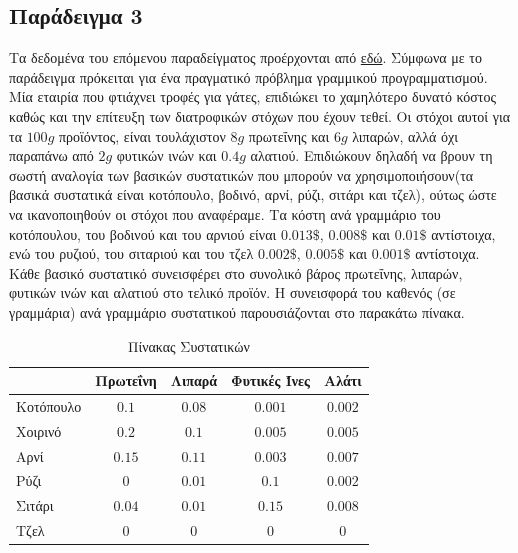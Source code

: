 \subsection{Παράδειγμα 3}
Τα δεδομένα του επόμενου παραδείγματος προέρχονται από
\href{http://pythonhosted.org/PuLP/CaseStudies/a_blending_problem.html}{εδώ}.
Σύμφωνα με το παράδειγμα πρόκειται για ένα πραγματικό πρόβλημα γραμμικού προγραμματισμού.
Μία εταιρία που φτιάχνει τροφές για γάτες, επιδιώκει το χαμηλότερο δυνατό κόστος καθώς
και την επίτευξη των διατροφικών στόχων που έχουν τεθεί. Οι στόχοι αυτοί για τα $100 g$
προϊόντος, είναι τουλάχιστον $8 g$ πρωτεΐνης και $6 g$ λιπαρών, αλλά όχι παραπάνω
από $2 g$ φυτικών ινών και $0.4 g$ αλατιού. Επιδιώκουν δηλαδή να βρουν τη σωστή
αναλογία των βασικών συστατικών που μπορούν να χρησιμοποιήσουν(τα βασικά συστατικά
είναι κοτόπουλο, βοδινό, αρνί, ρύζι, σιτάρι και τζελ), ούτως ώστε να ικανοποιηθούν
οι στόχοι που αναφέραμε. Τα κόστη ανά γραμμάριο του κοτόπουλου, του βοδινού και του
αρνιού είναι $0.013\$$, $0.008\$$ και $0.01\$$ αντίστοιχα, ενώ του ρυζιού, του
σιταριού και του τζελ $0.002\$$, $0.005\$$ και $0.001\$$ αντίστοιχα. Κάθε βασικό
συστατικό συνεισφέρει στο συνολικό βάρος πρωτεΐνης, λιπαρών, φυτικών ινών και αλατιού
στο τελικό προϊόν. Η συνεισφορά του καθενός (σε γραμμάρια) ανά γραμμάριο συστατικού
παρουσιάζονται στο παρακάτω πίνακα.
\begin{table}[h]
    \centering
    \begin{tabulary}{0.95\textwidth}{ | p{2cm} | C | C | C | C | }
        \hline
        {}        & Πρωτεΐνη & Λιπαρά & Φυτικές Ίνες & Αλάτι \\ \hline
        Κοτόπουλο      & $0.1$             & $0.08$                    & $0.001$                   & $0.002$ \\ \hline
        Χοιρινό      & $0.2$            & $0.1$                    & $0.005$                 & $0.005$ \\ \hline
        Αρνί      & $0.15$            & $0.11$                    & $0.003$                 & $0.007$ \\ \hline
        Ρύζι      & $0$             & $0.01$                    & $0.1$                  & $0.002$ \\ \hline
        Σιτάρι      & $0.04$            & $0.01$                    & $0.15$                 & $0.008$  \\ \hline
        Τζελ     & $0$             & $0$                    & $0$                  & $0$ \\ \hline
    \end{tabulary}
    \caption{Πίνακας Συστατικών}\label{table:lp3}
\end{table}
